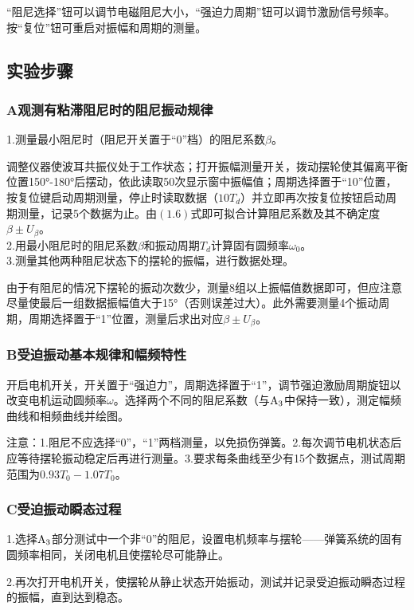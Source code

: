 \documentclass{ctexart}
\begin{document}
“阻尼选择”钮可以调节电磁阻尼大小，“强迫力周期”钮可以调节激励信号频率。按“复位”钮可重启对振幅和周期的测量。

\subsection{实验步骤}
\subsubsection*{A\quad 观测有粘滞阻尼时的阻尼振动规律}
\noindent 1.测量最小阻尼时（阻尼开关置于“0”档）的阻尼系数$\beta$。

调整仪器使波耳共振仪处于工作状态；打开振幅测量开关，拨动摆轮使其偏离平衡位置150°-180°后摆动，依此读取50次显示窗中振幅值；周期选择置于“10”位置，按复位键启动周期测量，停止时读取数据（$10T_d$）并立即再次按复位按钮启动周期测量，记录5个数据为止。由$(1.6)$式即可拟合计算阻尼系数及其不确定度$\beta \pm U_{\beta}$。\\
\noindent 2.用最小阻尼时的阻尼系数$\beta$和振动周期$T_d$计算固有圆频率$\omega_0$。\\
\noindent 3.测量其他两种阻尼状态下的摆轮的振幅，进行数据处理。

由于有阻尼的情况下摆轮的振动次数少，测量8组以上振幅值数据即可，但应注意尽量使最后一组数据振幅值大于15°（否则误差过大）。此外需要测量4个振动周期，周期选择置于“1”位置，测量后求出对应$\beta \pm U_{\beta}$。\vspace{.2em}
\subsubsection*{B\quad 受迫振动基本规律和幅频特性}
开启电机开关，开关置于“强迫力”，周期选择置于“1”，调节强迫激励周期旋钮以改变电机运动圆频率$\omega$。选择两个不同的阻尼系数（与$\rm{A_3}$中保持一致），测定幅频曲线和相频曲线并绘图。

注意：1.阻尼不应选择“0”，“1”两档测量，以免损伤弹簧。2.每次调节电机状态后应等待摆轮振动稳定后再进行测量。3.要求每条曲线至少有15个数据点，测试周期范围为$0.93T_0-1.07T_0$。
\subsubsection*{C\quad 受迫振动瞬态过程}
\noindent 1.选择$\rm{A_3}$部分测试中一个非“0”的阻尼，设置电机频率与摆轮——弹簧系统的固有圆频率相同，关闭电机且使摆轮尽可能静止。

\noindent 2.再次打开电机开关，使摆轮从静止状态开始振动，测试并记录受迫振动瞬态过程的振幅，直到达到稳态。
\end{document}
